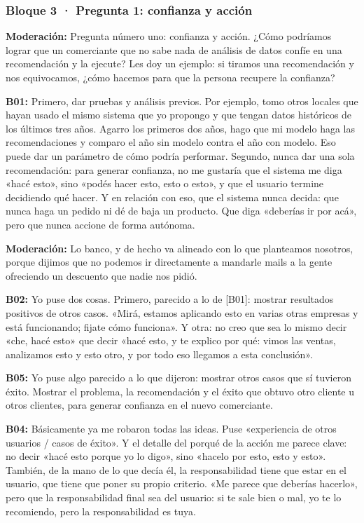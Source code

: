 \subsubsection*{Bloque 3 · Pregunta 1: confianza y acción}

\noindent\textbf{Moderación:} Pregunta número uno: confianza y acción. ¿Cómo podríamos lograr que un comerciante que no sabe nada de análisis de datos confíe en una recomendación y la ejecute? Les doy un ejemplo: si tiramos una recomendación y nos equivocamos, ¿cómo hacemos para que la persona recupere la confianza?

\noindent\textbf{B01:} Primero, dar pruebas y análisis previos. Por ejemplo, tomo otros locales que hayan usado el mismo sistema que yo propongo y que tengan datos históricos de los últimos tres años. Agarro los primeros dos años, hago que mi modelo haga las recomendaciones y comparo el año sin modelo contra el año con modelo. Eso puede dar un parámetro de cómo podría performar. Segundo, nunca dar una sola recomendación: para generar confianza, no me gustaría que el sistema me diga «hacé esto», sino «podés hacer esto, esto o esto», y que el usuario termine decidiendo qué hacer. Y en relación con eso, que el sistema nunca decida: que nunca haga un pedido ni dé de baja un producto. Que diga «deberías ir por acá», pero que nunca accione de forma autónoma.

\noindent\textbf{Moderación:} Lo banco, y de hecho va alineado con lo que planteamos nosotros, porque dijimos que no podemos ir directamente a mandarle mails a la gente ofreciendo un descuento que nadie nos pidió.

\noindent\textbf{B02:} Yo puse dos cosas. Primero, parecido a lo de [B01]: mostrar resultados positivos de otros casos. «Mirá, estamos aplicando esto en varias otras empresas y está funcionando; fijate cómo funciona». Y otra: no creo que sea lo mismo decir «che, hacé esto» que decir «hacé esto, y te explico por qué: vimos las ventas, analizamos esto y esto otro, y por todo eso llegamos a esta conclusión».

\noindent\textbf{B05:} Yo puse algo parecido a lo que dijeron: mostrar otros casos que sí tuvieron éxito. Mostrar el problema, la recomendación y el éxito que obtuvo otro cliente u otros clientes, para generar confianza en el nuevo comerciante.

\noindent\textbf{B04:} Básicamente ya me robaron todas las ideas. Puse «experiencia de otros usuarios / casos de éxito». Y el detalle del porqué de la acción me parece clave: no decir «hacé esto porque yo lo digo», sino «hacelo por esto, esto y esto». También, de la mano de lo que decía él, la responsabilidad tiene que estar en el usuario, que tiene que poner su propio criterio. «Me parece que deberías hacerlo», pero que la responsabilidad final sea del usuario: si te sale bien o mal, yo te lo recomiendo, pero la responsabilidad es tuya.

